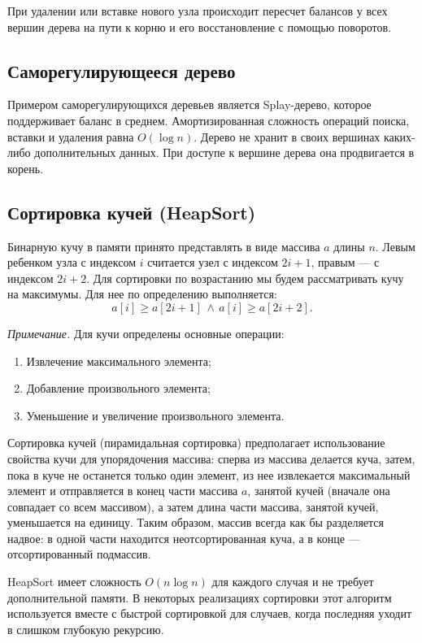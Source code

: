 При удалении или вставке нового узла происходит пересчет балансов у всех вершин дерева на пути к корню
и его восстановление с помощью поворотов.

\subsection{Саморегулирующееся дерево}
Примером саморегулирующихся деревьев является Splay-дерево, которое поддерживает баланс в среднем.
Амортизированная сложность операций поиска, вставки и удаления равна $O(\log n)$. Дерево не хранит
в своих вершинах каких-либо дополнительных данных. При доступе к вершине дерева она продвигается в корень.

\subsection{Сортировка кучей (HeapSort)}
\label{sec:heap}

Бинарную кучу в памяти принято представлять в виде массива $a$ длины $n$.
Левым ребенком узла с индексом $i$ считается узел с индексом $2i+1$,
правым --- с индексом $2i+2$. Для сортировки по возрастанию мы будем рассматривать кучу
на максимумы. Для нее по определению выполняется:
$$ a[i] \geq a[2i+1]\, \land\, a[i] \geq a[2i+2]. $$

{\small
\textit{Примечание.} Для кучи определены основные операции:
\begin{enumerate}
  \item Извлечение максимального элемента;
  \item Добавление произвольного элемента;
  \item Уменьшение и увеличение произвольного элемента.
\end{enumerate}
}

Сортировка кучей (пирамидальная сортировка) предполагает использование свойства кучи для упорядочения массива:
сперва из массива делается куча, затем, пока в куче не останется только один элемент,
из нее извлекается максимальный элемент и отправляется в конец части массива $a$,
занятой кучей (вначале она совпадает со всем массивом), а затем длина части массива,
занятой кучей, уменьшается на единицу. Таким образом, массив всегда как бы разделяется
надвое: в одной части находится неотсортированная куча, а в конце --- отсортированный
подмассив.

HeapSort имеет сложность $O(n\log n)$ для каждого случая и не требует дополнительной памяти. В некоторых
реализациях сортировки этот алгоритм используется вместе с быстрой сортировкой для случаев, когда
последняя уходит в слишком глубокую рекурсию.

